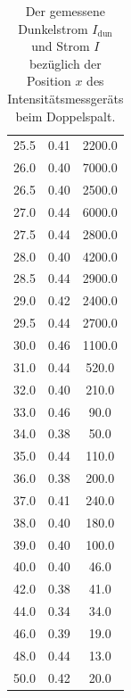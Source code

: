 \begin{table}
\begin{tabular}[t]{|ccc}
    25.5 & 0.41 & 2200.0    \\
    26.0 & 0.40 & 7000.0    \\
    26.5 & 0.40 & 2500.0    \\
    27.0 & 0.44 & 6000.0    \\
    27.5 & 0.44 & 2800.0    \\
    28.0 & 0.40 & 4200.0    \\
    28.5 & 0.44 & 2900.0    \\
    29.0 & 0.42 & 2400.0    \\
    29.5 & 0.44 & 2700.0    \\
    30.0 & 0.46 & 1100.0    \\
    31.0 & 0.44 & 520.0     \\
    32.0 & 0.40 & 210.0     \\
    33.0 & 0.46 & 90.0      \\
    34.0 & 0.38 & 50.0      \\
    35.0 & 0.44 & 110.0     \\
    36.0 & 0.38 & 200.0     \\
    37.0 & 0.41 & 240.0     \\
    38.0 & 0.40 & 180.0     \\
    39.0 & 0.40 & 100.0     \\
    40.0 & 0.40 & 46.0      \\
    42.0 & 0.38 & 41.0      \\
    44.0 & 0.34 & 34.0      \\
    46.0 & 0.39 & 19.0      \\
    48.0 & 0.44 & 13.0      \\
    50.0 & 0.42 & 20.0      \\
    \bottomrule
    \end{tabular}
    \caption{Der gemessene Dunkelstrom $I_\text{dun}$ und Strom $I$ bezüglich der Position $x$ des Intensitätsmessgeräts beim Doppelspalt.}
    \label{tab:doppel}
\end{table}